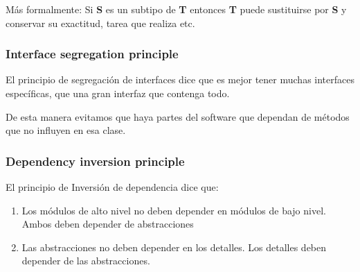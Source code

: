 M\'{a}s formalmente: Si \textbf{S} es un subtipo de \textbf{T} entonces \textbf{T} puede sustituirse por \textbf{S} y 
conservar su exactitud, tarea que realiza etc.

\subsubsection{Interface segregation principle}
El principio de segregaci\'{o}n de interfaces dice que es mejor tener muchas interfaces espec\'{i}ficas, que una gran interfaz que contenga todo.

De esta manera evitamos que haya partes del software que dependan de m\'{e}todos que no influyen en esa clase.

\subsubsection{Dependency inversion principle}
El principio de Inversi\'{o}n de dependencia dice que:
\begin{enumerate}
    \item Los m\'{o}dulos de alto nivel no deben depender en m\'{o}dulos de bajo nivel. Ambos deben depender de abstracciones
    \item Las abstracciones no deben depender en los detalles. Los detalles deben depender de las abstracciones.
\end{enumerate}
